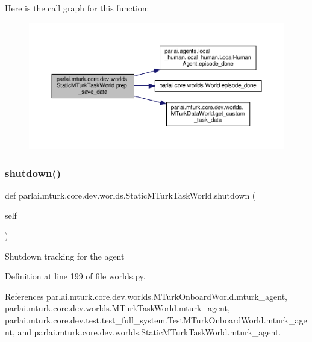 Here is the call graph for this function\+:
\nopagebreak
\begin{figure}[H]
\begin{center}
\leavevmode
\includegraphics[width=350pt]{classparlai_1_1mturk_1_1core_1_1dev_1_1worlds_1_1StaticMTurkTaskWorld_a5eb7b6e957de17b89a2e24c3d6fef751_cgraph}
\end{center}
\end{figure}
\mbox{\label{classparlai_1_1mturk_1_1core_1_1dev_1_1worlds_1_1StaticMTurkTaskWorld_a75fabb1fa04ac186143e76abd756f372}} 
\subsubsection{\texorpdfstring{shutdown()}{shutdown()}}
{\footnotesize\ttfamily def parlai.\+mturk.\+core.\+dev.\+worlds.\+Static\+M\+Turk\+Task\+World.\+shutdown (\begin{DoxyParamCaption}\item[{}]{self }\end{DoxyParamCaption})}

\begin{DoxyVerb}Shutdown tracking for the agent\end{DoxyVerb}
 

Definition at line 199 of file worlds.\+py.



References parlai.\+mturk.\+core.\+dev.\+worlds.\+M\+Turk\+Onboard\+World.\+mturk\+\_\+agent, parlai.\+mturk.\+core.\+dev.\+worlds.\+M\+Turk\+Task\+World.\+mturk\+\_\+agent, parlai.\+mturk.\+core.\+dev.\+test.\+test\+\_\+full\+\_\+system.\+Test\+M\+Turk\+Onboard\+World.\+mturk\+\_\+agent, and parlai.\+mturk.\+core.\+dev.\+worlds.\+Static\+M\+Turk\+Task\+World.\+mturk\+\_\+agent.



